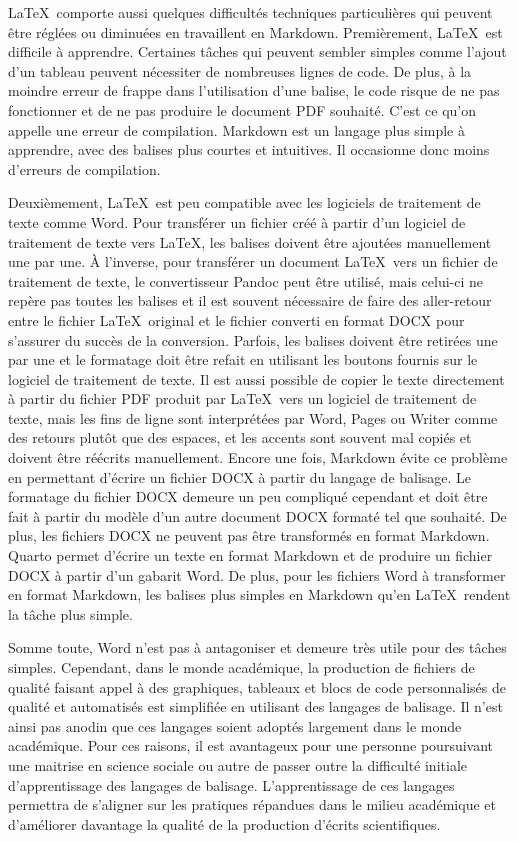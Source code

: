 \documentclass[
  letterpaper,
]{scrbook}
\begin{document}
\LaTeX~comporte aussi quelques difficultés techniques particulières qui
peuvent être réglées ou diminuées en travaillent en Markdown.
Premièrement, \LaTeX~est difficile à apprendre. Certaines tâches qui
peuvent sembler simples comme l'ajout d'un tableau peuvent nécessiter de
nombreuses lignes de code. De plus, à la moindre erreur de frappe dans
l'utilisation d'une balise, le code risque de ne pas fonctionner et de
ne pas produire le document PDF souhaité. C'est ce qu'on appelle une
erreur de compilation. Markdown est un langage plus simple à apprendre,
avec des balises plus courtes et intuitives. Il occasionne donc moins
d'erreurs de compilation.

Deuxièmement, \LaTeX~est peu compatible avec les logiciels de traitement
de texte comme Word. Pour transférer un fichier créé à partir d'un
logiciel de traitement de texte vers \LaTeX, les balises doivent être
ajoutées manuellement une par une. À l'inverse, pour transférer un
document \LaTeX~vers un fichier de traitement de texte, le convertisseur
Pandoc peut être utilisé, mais celui-ci ne repère pas toutes les balises
et il est souvent nécessaire de faire des aller-retour entre le fichier
\LaTeX~original et le fichier converti en format DOCX pour s'assurer du
succès de la conversion. Parfois, les balises doivent être retirées une
par une et le formatage doit être refait en utilisant les boutons
fournis sur le logiciel de traitement de texte. Il est aussi possible de
copier le texte directement à partir du fichier PDF produit par
\LaTeX~vers un logiciel de traitement de texte, mais les fins de ligne
sont interprétées par Word, Pages ou Writer comme des retours plutôt que
des espaces, et les accents sont souvent mal copiés et doivent être
réécrits manuellement. Encore une fois, Markdown évite ce problème en
permettant d'écrire un fichier DOCX à partir du langage de balisage. Le
formatage du fichier DOCX demeure un peu compliqué cependant et doit
être fait à partir du modèle d'un autre document DOCX formaté tel que
souhaité. De plus, les fichiers DOCX ne peuvent pas être transformés en
format Markdown. Quarto permet d'écrire un texte en format Markdown et
de produire un fichier DOCX à partir d'un gabarit Word. De plus, pour
les fichiers Word à transformer en format Markdown, les balises plus
simples en Markdown qu'en \LaTeX~rendent la tâche plus simple.

Somme toute, Word n'est pas à antagoniser et demeure très utile pour des
tâches simples. Cependant, dans le monde académique, la production de
fichiers de qualité faisant appel à des graphiques, tableaux et blocs de
code personnalisés de qualité et automatisés est simplifiée en utilisant
des langages de balisage. Il n'est ainsi pas anodin que ces langages
soient adoptés largement dans le monde académique. Pour ces raisons, il
est avantageux pour une personne poursuivant une maitrise en science
sociale ou autre de passer outre la difficulté initiale d'apprentissage
des langages de balisage. L'apprentissage de ces langages permettra de
s'aligner sur les pratiques répandues dans le milieu académique et
d'améliorer davantage la qualité de la production d'écrits
scientifiques.
\end{document}
